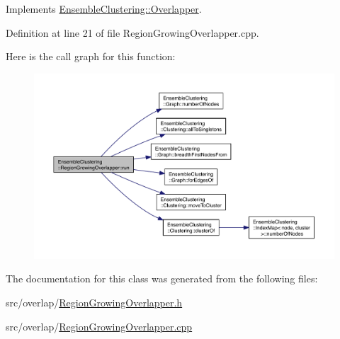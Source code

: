 Implements \hyperlink{class_ensemble_clustering_1_1_overlapper_a427ef1bf113f2c59e26e3e3f7c3d266b}{Ensemble\-Clustering\-::\-Overlapper}.



Definition at line 21 of file Region\-Growing\-Overlapper.\-cpp.



Here is the call graph for this function\-:
\nopagebreak
\begin{figure}[H]
\begin{center}
\leavevmode
\includegraphics[width=350pt]{class_ensemble_clustering_1_1_region_growing_overlapper_a2b164486347878e81101abc9a89b47d9_cgraph}
\end{center}
\end{figure}




The documentation for this class was generated from the following files\-:\begin{DoxyCompactItemize}
\item 
src/overlap/\hyperlink{_region_growing_overlapper_8h}{Region\-Growing\-Overlapper.\-h}\item 
src/overlap/\hyperlink{_region_growing_overlapper_8cpp}{Region\-Growing\-Overlapper.\-cpp}\end{DoxyCompactItemize}
